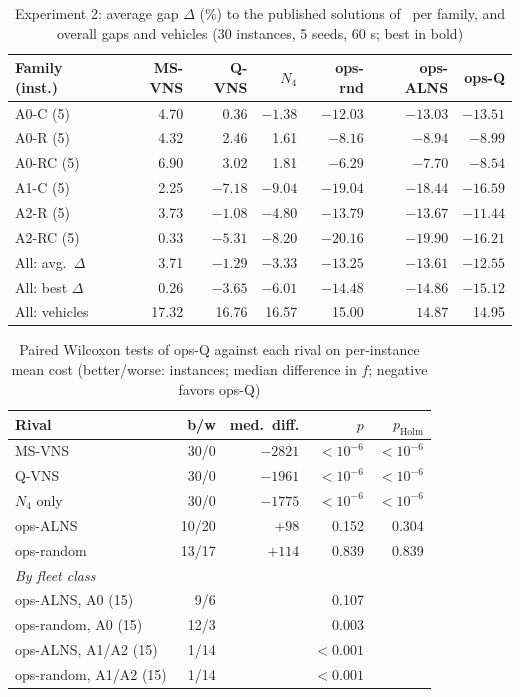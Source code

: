 \documentclass[conference]{IEEEtran}
\begin{document}
\begin{table}[t]
\caption{Experiment 2: average gap $\Delta$ (\%) to the published solutions of~\cite{masmoudi2026} per family, and overall gaps and vehicles (30 instances, 5 seeds, 60 s; best in bold)}\label{tab:main}
\centering\setlength{\tabcolsep}{2.6pt}
\begin{tabular}{lrrrrrr}
\toprule
Family (inst.) & MS-VNS & Q-VNS & $N_4$ & ops-rnd & ops-ALNS & ops-Q \\
\midrule
A0-C (5)  & 4.70 & 0.36 & $-1.38$ & $-12.03$ & $-13.03$ & $\mathbf{-13.51}$ \\
A0-R (5)  & 4.32 & 2.46 & 1.61 & $-8.16$ & $-8.94$ & $\mathbf{-8.99}$ \\
A0-RC (5) & 6.90 & 3.02 & 1.81 & $-6.29$ & $-7.70$ & $\mathbf{-8.54}$ \\
A1-C (5)  & 2.25 & $-7.18$ & $-9.04$ & $\mathbf{-19.04}$ & $-18.44$ & $-16.59$ \\
A2-R (5)  & 3.73 & $-1.08$ & $-4.80$ & $\mathbf{-13.79}$ & $-13.67$ & $-11.44$ \\
A2-RC (5) & 0.33 & $-5.31$ & $-8.20$ & $\mathbf{-20.16}$ & $-19.90$ & $-16.21$ \\
\midrule
All: avg.\ $\Delta$ & 3.71 & $-1.29$ & $-3.33$ & $-13.25$ & $\mathbf{-13.61}$ & $-12.55$ \\
All: best $\Delta$  & 0.26 & $-3.65$ & $-6.01$ & $-14.48$ & $-14.86$ & $\mathbf{-15.12}$ \\
All: vehicles       & 17.32 & 16.76 & 16.57 & 15.00 & $\mathbf{14.87}$ & 14.95 \\
\bottomrule
\end{tabular}
\end{table}

\begin{table}[t]
\caption{Paired Wilcoxon tests of ops-Q against each rival on per-instance mean cost (better/worse: instances; median difference in $f$; negative favors ops-Q)}\label{tab:tests}
\centering
\begin{tabular}{lrrrr}
\toprule
Rival & b/w & med.\ diff. & $p$ & $p_{\text{Holm}}$ \\
\midrule
MS-VNS & 30/0 & $-2821$ & $<10^{-6}$ & $<10^{-6}$ \\
Q-VNS & 30/0 & $-1961$ & $<10^{-6}$ & $<10^{-6}$ \\
$N_4$ only & 30/0 & $-1775$ & $<10^{-6}$ & $<10^{-6}$ \\
ops-ALNS & 10/20 & $+98$ & 0.152 & 0.304 \\
ops-random & 13/17 & $+114$ & 0.839 & 0.839 \\
\midrule
\multicolumn{5}{l}{\textit{By fleet class}}\\
ops-ALNS, A0 (15) & 9/6 & & 0.107 & \\
ops-random, A0 (15) & 12/3 & & 0.003 & \\
ops-ALNS, A1/A2 (15) & 1/14 & & $<0.001$ & \\
ops-random, A1/A2 (15) & 1/14 & & $<0.001$ & \\
\bottomrule
\end{tabular}
\end{table}
\end{document}

